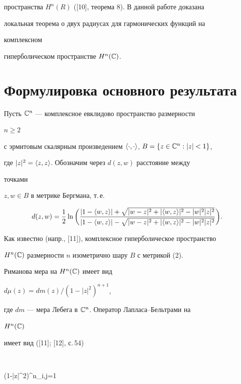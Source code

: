 пространства $H^n(R)$ ([10], теорема 8). В данной работе доказана 


локальная теорема о двух радиусах для гармонических функций на 


комплексном 


гиперболическом пространстве $H^n(\Bbb C)$. 


 


\section{Формулировка основного результата} 


 


Пусть $\Bbb C^n$ --- комплексное евклидово пространство размерности 


$n\ge2$ 


с эрмитовым скалярным произведением $\la\cdot,\cdot\ra$, $B=\{z\in\Bbb 


C^n:|z|<1\}$, 


где $|z|^2=\langle z,z\rangle$. Обозначим через $d(z,w)$ расстояние между 


точками 


$z,w\in B$ в метрике Бергмана, т.\,е. 


\begin{equation} 


d(z,w)=\frac{1}{2}\ln\bigg( 


\frac{|1-\la w,z\ra|+\sqrt{|w-z|^2+ 


|\la w,z\ra|^2-|w|^2|z|^2}} 


{|1-\la w,z\ra|-\sqrt{|w-z|^2+|\la w,z\ra|^2- 


|w|^2|z|^2}}\bigg).


\end{equation} 


Как известно (напр., [11]), комплексное гиперболическое пространство 


$H^n(\Bbb C)$ размерности $n$ изометрично шару $B$ с метрикой (2). 


Риманова мера на $H^n(\Bbb C)$ имеет вид 


$d\mu(z)=d m(z)/(1-|z|^2)^{n+1}$, 


где $d m$ --- мера Лебега в $\Bbb C^n$. Оператор Лапласа--Бельтрами на 


$H^n(\Bbb C)$ 


имеет вид ([11]; [12], с.\,54) 


$$ 


\wt{}(1-|z|^2)\sum^n_{i,j=1} 


